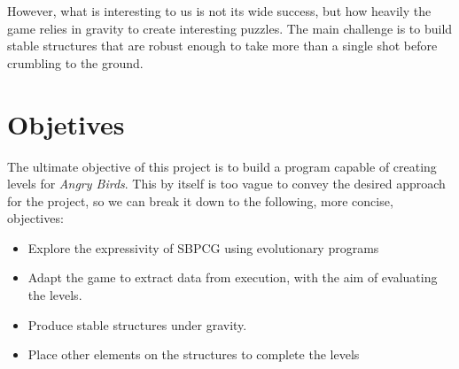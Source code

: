However, what is interesting to us is not its wide success, but how heavily the game relies in gravity to create interesting puzzles. The main challenge is to build stable structures that are robust enough to take more than a single shot before crumbling to the ground.

\section{Objetives}

The ultimate objective of this project is to build a program capable of creating levels for \textit{Angry Birds}. This by itself is too vague to convey the desired approach for the project, so we can break it down to the following, more concise, objectives:

\begin{itemize}
	\item Explore the expressivity of \ac{SBPCG} using evolutionary programs
	\item Adapt the game to extract data from execution, with the aim of evaluating the levels.
	\item Produce stable structures under gravity.
	\item Place other elements on the structures to complete the levels
\end{itemize} 


